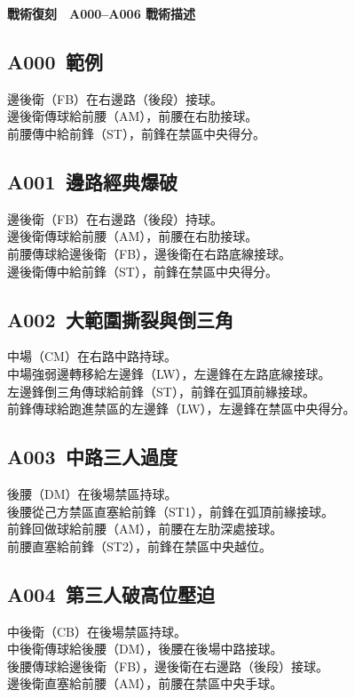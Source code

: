 \documentclass[10pt]{article}
\begin{document}
\noindent
{\Large\bfseries 戰術復刻　A000–A006 戰術描述\par}
\vspace{0.6em}
\subsection*{A000\, 範例}
\noindent
邊後衛（FB）在右邊路（後段）接球。\\
邊後衛傳球給前腰（AM），前腰在右肋接球。\\
前腰傳中給前鋒（ST），前鋒在禁區中央得分。
\vspace{0.5em}

\subsection*{A001\, 邊路經典爆破}
\noindent
邊後衛（FB）在右邊路（後段）持球。\\
邊後衛傳球給前腰（AM），前腰在右肋接球。\\
前腰傳球給邊後衛（FB），邊後衛在右路底線接球。\\
邊後衛傳中給前鋒（ST），前鋒在禁區中央得分。
\vspace{0.5em}

\subsection*{A002\, 大範圍撕裂與倒三角}
\noindent
中場（CM）在右路中路持球。\\
中場強弱邊轉移給左邊鋒（LW），左邊鋒在左路底線接球。\\
左邊鋒倒三角傳球給前鋒（ST），前鋒在弧頂前緣接球。\\
前鋒傳球給跑進禁區的左邊鋒（LW），左邊鋒在禁區中央得分。
\vspace{0.5em}

\subsection*{A003\, 中路三人過度}
\noindent 後腰（DM）在後場禁區持球。\\
後腰從己方禁區直塞給前鋒（ST1），前鋒在弧頂前緣接球。\\
前鋒回做球給前腰（AM），前腰在左肋深處接球。\\
前腰直塞給前鋒（ST2），前鋒在禁區中央越位。
\vspace{0.5em}

\subsection*{A004\, 第三人破高位壓迫}
\noindent 中後衛（CB）在後場禁區持球。\\
中後衛傳球給後腰（DM），後腰在後場中路接球。\\
後腰傳球給邊後衛（FB），邊後衛在右邊路（後段）接球。\\
邊後衛直塞給前腰（AM），前腰在禁區中央手球。
\vspace{0.5em}
\end{document}
